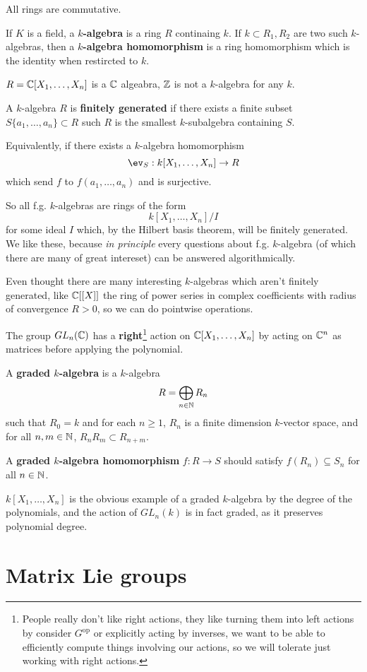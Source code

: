 \documentclass{article}
\begin{document}
All rings are commutative.

\begin{definition}
    If $K$ is a field, a \textbf{$k$-algebra} is a ring $R$ continaing $k$. If $k\subset R_1,R_2$ are two such $k$-algebras, then a \textbf{$k$-algebra homomorphism} is a ring homomorphism which is the identity when restircted to $k$.
\end{definition}

$R=\mathbb{C}[X_1,\ldots,X_n]$ is a $\mathbb{C}$ algeabra, $\mathbb{Z}$ is not a $k$-algebra for any $k$.

\begin{definition}
    A $k$-algebra $R$ is \textbf{finitely generated} if there exists a finite subset $S\{a_1,\ldots,a_n\}\subset R$ such $R$ is the smallest $k$-subalgebra containing $S$.

    Equivalently, if there exists a $k$-algebra homomorphism \[
    \ev_S:k[X_1,\ldots,X_n]\rightarrow R
    \] which send $f$ to $f(a_1,\ldots,a_n)$ and is surjective.
\end{definition}

So all f.g. $k$-algebras are rings of the form \[
k[X_1,\ldots,X_n]/I
\] for some ideal $I$ which, by the Hilbert basis theorem, will be finitely generated. We like these, because \textit{in principle} every questions about f.g. $k$-algebra (of which there are many of great intereset) can be answered algorithmically.

Even thought there are many interesting $k$-algebras which aren't finitely generated, like $\mathbb{C}[[X]]$ the ring of power series in complex coefficients with radius of convergence $R>0$, so we can do pointwise operations.

The group $GL_n(\mathbb{C})$ has a \textbf{right}\footnote{People really don't like right actions, they like turning them into left actions by consider $G^\text{op}$ or explicitly acting  by inverses, we want to be able to efficiently compute things involving our actions, so we will tolerate just working with right actions.} action on $\mathbb{C}[X_1,\ldots,X_n]$ by acting on $\mathbb{C}^n$ as matrices before applying the polynomial.

\begin{definition}
    A \textbf{graded $k$-algebra} is a $k$-algebra \[
    R = \bigoplus_{n\in\mathbb{N}}R_n
    \] such that $R_0=k$ and for each $n\geq 1$, $R_n$ is a finite dimension $k$-vector space, and for all $n,m\in\mathbb{N}$, $R_nR_m\subset R_{n+m}$.

    A \textbf{graded $k$-algebra homomorphism} $f:R\rightarrow S$ should satisfy $f(R_n)\subseteq S_n$ for all $n\in \mathbb{N}$.
\end{definition}

$k[X_1,\ldots,X_n]$ is the obvious example of a graded $k$-algebra by the degree of the polynomials, and the action of $GL_n(k)$ is in fact graded, as it preserves polynomial degree.

\section{Matrix Lie groups}
\end{document}
